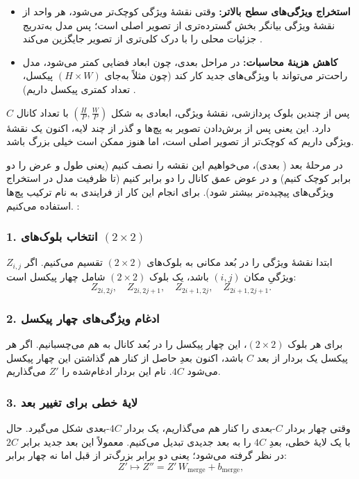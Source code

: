 \begin{itemize}
	\item \textbf{استخراج ویژگی‌های سطح بالاتر:}
	وقتی نقشهٔ ویژگی کوچک‌تر می‌شود، هر واحد از نقشهٔ ویژگی بیانگر بخش گسترده‌تری از تصویر اصلی است؛ 
	پس مدل به‌تدریج جزئیات محلی را با درک کلی‌تری از تصویر جایگزین می‌کند \cite{he2016deep}.
	
	\item \textbf{کاهش هزینهٔ محاسبات:}
	در مراحل بعدی، چون ابعاد فضایی کمتر می‌شود، مدل راحت‌تر می‌تواند با ویژگی‌های جدید کار کند 
	(چون مثلاً به‌جای \((H \times W)\) پیکسل، تعداد کمتری پیکسل داریم) \cite{liu2021swintransformer}.
\end{itemize}


پس از چندین بلوک پردازشی، نقشهٔ ویژگی، ابعادی به شکل \((\tfrac{H}{P}, \tfrac{W}{P})\) با تعداد کانال \(\displaystyle C\) دارد. 
این یعنی پس از برش‌دادن تصویر به پچ‌ها و گذر از چند لایه، اکنون یک نقشهٔ ویژگی داریم که کوچک‌تر از تصویر اصلی است، 
اما هنوز ممکن است خیلی بزرگ باشد.

در مرحلهٔ بعد ( بعدی)، می‌خواهیم این نقشه را نصف کنیم 
(یعنی طول و عرض را دو برابر کوچک کنیم) و در عوض عمق کانال را دو برابر کنیم 
(تا ظرفیت مدل در استخراج ویژگی‌های پیچیده‌تر بیشتر شود). برای انجام این کار از فرایندی به نام 
ترکیب پچ‌ها استفاده می‌کنیم.
\cite{liu2021swintransformer}:

\subsubsection{1. انتخاب بلوک‌های \((2 \times 2)\)}
ابتدا نقشهٔ ویژگی را در بُعد مکانی به بلوک‌های \((2 \times 2)\) تقسیم می‌کنیم.  
اگر \(\displaystyle Z_{i,j}\) ویژگیِ مکان \((i, j)\) باشد، 
یک بلوک \((2 \times 2)\) شامل چهار پیکسل است:
\[
Z_{2i, 2j}, \quad Z_{2i, 2j+1}, \quad Z_{2i+1, 2j}, \quad Z_{2i+1, 2j+1}.
\]

\subsubsection{2. ادغام ویژگی‌های چهار پیکسل}
برای هر بلوک \((2 \times 2)\)، این چهار پیکسل را در بُعد کانال به هم می‌چسبانیم.  
اگر هر پیکسل یک بردار از بعد \(\displaystyle C\) باشد، اکنون بعدِ حاصل از کنار هم گذاشتن این چهار پیکسل می‌شود \(\displaystyle 4C\).  
نام این بردار ادغام‌شده را \(\displaystyle Z'\) می‌گذاریم.

\subsubsection{3. لایهٔ خطی برای تغییر بعد}
وقتی چهار بردار \(\displaystyle C\)-بعدی را کنار هم می‌گذاریم، یک بردار \(\displaystyle 4C\)-بعدی شکل می‌گیرد.  
حال با یک لایهٔ خطی، بعدِ \(\displaystyle 4C\) را به بعد جدیدی تبدیل می‌کنیم.  
معمولاً این بعد جدید برابر \(\displaystyle 2C\) در نظر گرفته می‌شود؛ 
یعنی دو برابر بزرگ‌تر از قبل اما نه چهار برابر:
\begin{equation}
	Z' \mapsto Z'' = Z' \, W_{\text{merge}} + b_{\text{merge}},
	\label{eq:merge_transform}
\end{equation}

